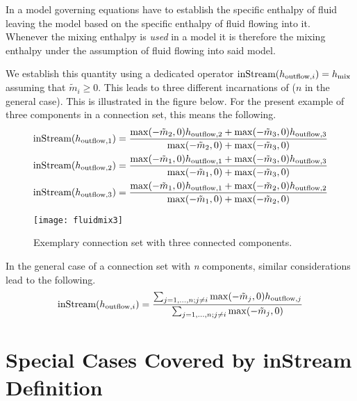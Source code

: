 In a model governing equations have to establish the specific enthalpy
of fluid leaving the model based on the specific enthalpy of fluid
flowing into it. Whenever the mixing enthalpy is \emph{used} in a model
it is therefore the mixing enthalpy under the assumption of fluid
flowing into said model.

We establish this quantity using a dedicated operator $\text{\lstinline!inStream!}(h_{\mathrm{outflow},i})=h_{\mathrm{mix}}$ assuming that $\tilde{m}_{i} \geq 0$. This leads to
three different incarnations of ($n$ in the general case). This is
illustrated in the figure below. For the present example of three
components in a connection set, this means the following.
\begin{align*}
\text{\lstinline!inStream!}(h_{\mathrm{outflow},1}) &= \frac{\operatorname{max}(-\tilde{m}_2,0)h_{\mathrm{outflow},2}+\operatorname{max}(-\tilde{m}_3,0)h_{\mathrm{outflow},3}}{\operatorname{max}(-\tilde{m}_2,0)+\operatorname{max}(-\tilde{m}_3,0)}\\
\text{\lstinline!inStream!}(h_{\mathrm{outflow},2}) &= \frac{\operatorname{max}(-\tilde{m}_1,0)h_{\mathrm{outflow},1}+\operatorname{max}(-\tilde{m}_3,0)h_{\mathrm{outflow},3}}{\operatorname{max}(-\tilde{m}_1,0)+\operatorname{max}(-\tilde{m}_3,0)}\\
\text{\lstinline!inStream!}(h_{\mathrm{outflow},3}) &= \frac{\operatorname{max}(-\tilde{m}_1,0)h_{\mathrm{outflow},1}+\operatorname{max}(-\tilde{m}_2,0)h_{\mathrm{outflow},2}}{\operatorname{max}(-\tilde{m}_1,0)+\operatorname{max}(-\tilde{m}_2,0)}
\end{align*}
\begin{figure}[H]
  \begin{center}
    \texttt{[image: fluidmix3]}
  \end{center}
  \caption{Exemplary connection set with three connected components.}
\end{figure}

In the general case of a connection set with \emph{n} components,
similar considerations lead to the following.
\begin{equation*}
\text{\lstinline!inStream!}(h_{\mathrm{outflow},i})=\frac{\sum_{j=1,\dotsc,n;j\neq i}\operatorname{max}(-\tilde{m}_j,0)h_{\mathrm{outflow},j}}{\sum_{j=1,\dotsc,n;j\neq i}\operatorname{max}(-\tilde{m}_j,0)}
\end{equation*}

\section{Special Cases Covered by inStream Definition}\label{special-cases-covered-by-the-instream-operator-definition}

